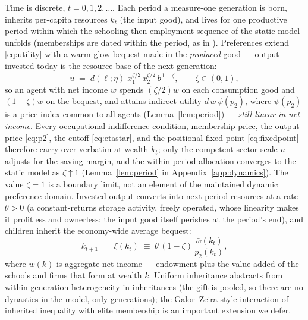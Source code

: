 \documentclass[12pt,letterpaper]{article}
\theoremstyle{definition}
\begin{document}
Time is discrete, $t=0,1,2,\dots$.
Each period a measure-one generation is born, inherits per-capita resources $k_t$ (the input good), and lives for one productive period within which the schooling-then-employment sequence of the static model unfolds (memberships are dated within the period, as in \citealt{ellickson2006organization}).
Preferences extend \eqref{eq:utility} with a warm-glow bequest made in the \emph{produced} good --- output invested today is the resource base of the next generation:
\begin{equation}\label{eq:olg-utility}
  u \;=\; d(\ell;\eta)\; x_1^{\zeta/2}\, x_2^{\zeta/2}\, b^{\,1-\zeta},
  \qquad \zeta\in(0,1),
\end{equation}
so an agent with net income $w$ spends $(\zeta/2)w$ on each consumption good and $(1-\zeta)w$ on the bequest, and attains indirect utility $d\,w\,\psi(p_2)$, where $\psi(p_2)$ is a price index common to all agents (Lemma~\ref{lem:period}) --- \emph{still linear in net income}.
Every occupational-indifference condition, membership price, the output price \eqref{eq:p2}, the cutoff \eqref{eq:etastar}, and the positional fixed point \eqref{eq:fixedpoint} therefore carry over verbatim at wealth $k_t$; only the competent-sector scale $n$ adjusts for the saving margin, and the within-period allocation converges to the static model as $\zeta\uparrow1$ (Lemma~\ref{lem:period} in Appendix~\ref{app:dynamics}).
The value $\zeta=1$ is a boundary limit, not an element of the maintained dynamic preference domain.
Invested output converts into next-period resources at a rate $\theta>0$ (a constant-returns storage activity, freely operated, whose linearity makes it profitless and ownerless; the input good itself perishes at the period's end), and children inherit the economy-wide average bequest:
\begin{equation}\label{eq:transition}
  k_{t+1} \;=\; \xi(k_t) \;\equiv\; \theta\,(1-\zeta)\,\frac{\bar{w}(k_t)}{p_2(k_t)},
\end{equation}
where $\bar{w}(k)$ is aggregate net income --- endowment plus the value added of the schools and firms that form at wealth $k$.
Uniform inheritance abstracts from within-generation heterogeneity in inheritances (the gift is pooled, so there are no dynasties in the model, only generations); the Galor--Zeira-style interaction of inherited inequality with elite membership is an important extension we defer.
\end{document}
